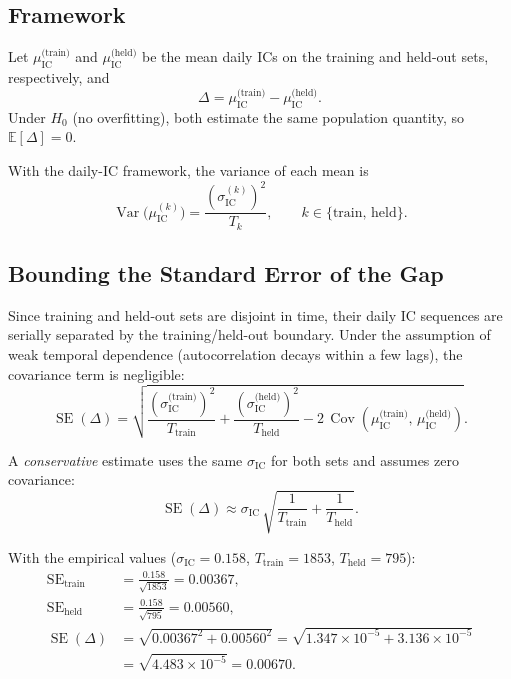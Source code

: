 \documentclass[11pt,a4paper]{article}
\theoremstyle{definition}
\newcommand{\IC}{\operatorname{IC}}
\newcommand{\Var}{\operatorname{Var}}
\newcommand{\Cov}{\operatorname{Cov}}
\newcommand{\E}{\mathbb{E}}
\newcommand{\SE}{\operatorname{SE}}
\newcommand{\Ho}{H_{0}}
\begin{document}
\subsection{Framework}

Let $\mu_{\IC}^{\text{(train)}}$ and $\mu_{\IC}^{\text{(held)}}$ be the
mean daily ICs on the training and held-out sets, respectively, and
\begin{equation}
    \Delta = \mu_{\IC}^{\text{(train)}} - \mu_{\IC}^{\text{(held)}}.
    \label{eq:gap_def}
\end{equation}
Under $\Ho$ (no overfitting), both estimate the same population quantity,
so $\E[\Delta]=0$.

With the daily-IC framework, the variance of each mean is
\begin{equation}
    \Var\!\bigl(\mu_{\IC}^{(k)}\bigr)
    = \frac{(\sigma_{\IC}^{(k)})^{2}}{T_{k}},
    \qquad k \in \{\text{train},\,\text{held}\}.
    \label{eq:var_mu_ic}
\end{equation}

\subsection{Bounding the Standard Error of the Gap}

Since training and held-out sets are disjoint in time, their daily IC
sequences are serially separated by the training/held-out boundary.
Under the assumption of weak temporal dependence (autocorrelation decays
within a few lags), the covariance term is negligible:
\begin{equation}
    \SE(\Delta) = \sqrt{
        \frac{(\sigma_{\IC}^{\text{(train)}})^{2}}{T_{\text{train}}}
      + \frac{(\sigma_{\IC}^{\text{(held)}})^{2}}{T_{\text{held}}}
      - 2\,\Cov(\mu_{\IC}^{\text{(train)}},\,
                 \mu_{\IC}^{\text{(held)}})
    }.
    \label{eq:se_gap_full}
\end{equation}

A \emph{conservative} estimate uses the same $\sigma_{\IC}$ for both sets
and assumes zero covariance:
\begin{equation}
    \SE(\Delta) \approx \sigma_{\IC}\,
    \sqrt{\frac{1}{T_{\text{train}}} + \frac{1}{T_{\text{held}}}}.
    \label{eq:se_gap_conservative}
\end{equation}

With the empirical values ($\sigma_{\IC}=0.158$, $T_{\text{train}}=1853$,
$T_{\text{held}}=795$):
\begin{align}
    \SE_{\text{train}} &= \frac{0.158}{\sqrt{1853}} = 0.00367, \nonumber \\
    \SE_{\text{held}}  &= \frac{0.158}{\sqrt{795}}  = 0.00560, \nonumber \\
    \SE(\Delta)        &= \sqrt{0.00367^{2} + 0.00560^{2}}
                        = \sqrt{1.347\!\times\!10^{-5}
                               + 3.136\!\times\!10^{-5}} \nonumber \\
                       &= \sqrt{4.483\!\times\!10^{-5}}
                        = \mathbf{0.00670}.
    \label{eq:se_gap_value}
\end{align}
\end{document}
